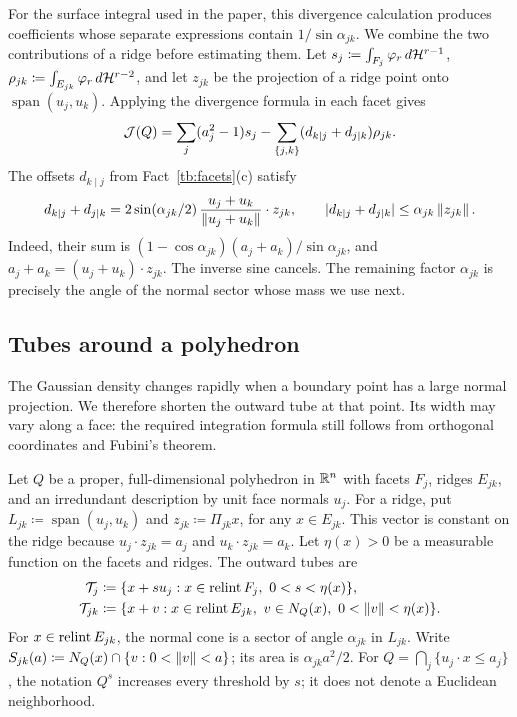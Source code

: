 \documentclass[11pt,letterpaper]{article}
\theoremstyle{plain}
\begin{document}
For the surface integral used in the paper, this divergence
calculation produces coefficients whose separate expressions contain
\(1/\sin\alpha_{jk}\). We combine the two contributions of a ridge
before estimating them. Let
\(s_j\coloneqq \int_{F_j}\varphi_r\,d\mathcal H^{r-1}\),
\(\rho_{jk}\coloneqq \int_{E_{jk}}\varphi_r\,d\mathcal H^{r-2}\), and let
\(z_{jk}\) be the projection of a ridge point onto
\(\operatorname{span}(u_j,u_k)\). Applying the divergence formula in
each facet gives
\[
 \mathcal J(Q)=\sum_j(a_j^2-1)s_j
       -\sum_{\{j,k\}}(d_{k\mid j}+d_{j\mid k})\rho_{jk}.
\]
The offsets \(d_{k\mid j}\) from Fact~\ref{tb:facets}(c) satisfy
\[
 d_{k\mid j}+d_{j\mid k}
 =2\sin(\alpha_{jk}/2)\,
       \frac{u_j+u_k}{\left\lVert u_j+u_k\right\rVert}\cdot z_{jk},\qquad
 |d_{k\mid j}+d_{j\mid k}|\le\alpha_{jk}\left\lVert z_{jk}\right\rVert.
\]
Indeed, their sum is
\((1-\cos\alpha_{jk})(a_j+a_k)/\sin\alpha_{jk}\), and
\(a_j+a_k=(u_j+u_k)\cdot z_{jk}\).
The inverse sine cancels. The remaining factor \(\alpha_{jk}\)
is precisely the angle of the normal sector whose mass we use next.

\subsection{Tubes around a polyhedron}\label{tb:sec:tubes}

The Gaussian density changes rapidly when a boundary point has a large
normal projection. We therefore shorten the outward tube at that point.
Its width may vary along a face: the required integration formula still
follows from orthogonal coordinates and Fubini's theorem.

Let \(Q\) be a proper, full-dimensional polyhedron in \(\mathbb R^n\) with
facets \(F_j\), ridges \(E_{jk}\), and an irredundant description by
unit face normals \(u_j\). For a ridge, put
\(L_{jk}\coloneqq \operatorname{span}(u_j,u_k)\) and
\(z_{jk}\coloneqq \Pi_{jk}x\), for any \(x\in E_{jk}\). This vector is constant
on the ridge because
\(u_j\cdot z_{jk}=a_j\) and \(u_k\cdot z_{jk}=a_k\).
Let \(\eta(x)>0\) be a measurable function on the facets and ridges.
The outward tubes are
\begin{align*}
 \mathcal T_j&\coloneqq \{x+s u_j:x\in\relint F_j,\ 0<s<\eta(x)\},\\
 \mathcal T_{jk}&\coloneqq \{x+v:x\in\relint E_{jk},\ v\in N_Q(x),\
                         0<\norm v<\eta(x)\}.
\end{align*}
For \(x\in\operatorname{relint} E_{jk}\), the normal cone is a sector of angle
\(\alpha_{jk}\) in \(L_{jk}\). Write
\(S_{jk}(a)\coloneqq N_Q(x)\cap\{v:0<\left\lVert v\right\rVert<a\}\); its area is
\(\alpha_{jk}a^2/2\). For \(Q=\bigcap_j\{u_j\cdot x\le a_j\}\),
the notation \(Q^s\) increases every threshold by \(s\); it does not
denote a Euclidean neighborhood.
\end{document}
